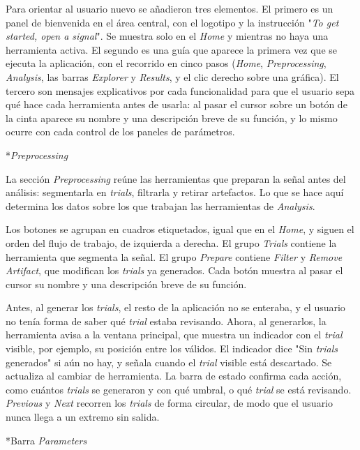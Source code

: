 \documentclass[12pt,letterpaper,oneside]{article}
\makeatletter
\newcommand{\subsubsubsection}[1]{%
  \@startsection{paragraph}{4}{\z@}{10pt plus 2pt minus 1pt}{4pt}%
    {\normalfont\normalsize\bfseries\itshape}*{#1}}
\makeatother
\begin{document}
Para orientar al usuario nuevo se añadieron tres elementos. El primero es un panel de bienvenida en el área central, con el logotipo y la instrucción "\textit{To get started, open a signal}". Se muestra solo en el \textit{Home} y mientras no haya una herramienta activa. El segundo es una guía que aparece la primera vez que se ejecuta la aplicación, con el recorrido en cinco pasos (\textit{Home}, \textit{Preprocessing}, \textit{Analysis}, las barras \textit{Explorer} y \textit{Results}, y el clic derecho sobre una gráfica). El tercero son mensajes explicativos por cada funcionalidad para que el usuario sepa qué hace cada herramienta antes de usarla: al pasar el cursor sobre un botón de la cinta aparece su nombre y una descripción breve de su función, y lo mismo ocurre con cada control de los paneles de parámetros.

\subsubsubsection{\textit{Preprocessing}}

La sección \textit{Preprocessing} reúne las herramientas que preparan la señal antes del análisis: segmentarla en \textit{trials}, filtrarla y retirar artefactos. Lo que se hace aquí determina los datos sobre los que trabajan las herramientas de \textit{Analysis}.

Los botones se agrupan en cuadros etiquetados, igual que en el \textit{Home}, y siguen el orden del flujo de trabajo, de izquierda a derecha. El grupo \textit{Trials} contiene la herramienta que segmenta la señal. El grupo \textit{Prepare} contiene \textit{Filter} y \textit{Remove Artifact}, que modifican los \textit{trials} ya generados. Cada botón muestra al pasar el cursor su nombre y una descripción breve de su función.

Antes, al generar los \textit{trials}, el resto de la aplicación no se enteraba, y el usuario no tenía forma de saber qué \textit{trial} estaba revisando. Ahora, al generarlos, la herramienta avisa a la ventana principal, que muestra un indicador con el \textit{trial} visible, por ejemplo, su posición entre los válidos. El indicador dice "Sin \textit{trials} generados" si aún no hay, y señala cuando el \textit{trial} visible está descartado. Se actualiza al cambiar de herramienta. La barra de estado confirma cada acción, como cuántos \textit{trials} se generaron y con qué umbral, o qué \textit{trial} se está revisando. \textit{Previous} y \textit{Next} recorren los \textit{trials} de forma circular, de modo que el usuario nunca llega a un extremo sin salida.

\subsubsubsection{Barra \textit{Parameters}}
\end{document}
